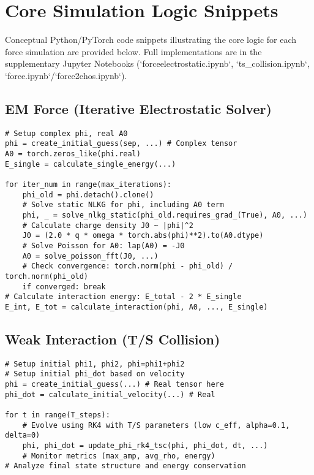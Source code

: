 \documentclass[11pt]{article}
\begin{document}
\appendix
\section{Core Simulation Logic Snippets}
\label{app:code}
Conceptual Python/PyTorch code snippets illustrating the core logic for each force simulation are provided below. Full implementations are in the supplementary Jupyter Notebooks (`forceelectrostatic.ipynb`, `ts_collision.ipynb`, `force.ipynb`/`force2ehos.ipynb`).

\subsection{EM Force (Iterative Electrostatic Solver)}
\begin{lstlisting}[caption=EM Force Logic, label=lst:em_code]
# Setup complex phi, real A0
phi = create_initial_guess(sep, ...) # Complex tensor
A0 = torch.zeros_like(phi.real) 
E_single = calculate_single_energy(...)

for iter_num in range(max_iterations):
    phi_old = phi.detach().clone()
    # Solve static NLKG for phi, including A0 term
    phi, _ = solve_nlkg_static(phi_old.requires_grad_(True), A0, ...) 
    # Calculate charge density J0 ~ |phi|^2
    J0 = (2.0 * q * omega * torch.abs(phi)**2).to(A0.dtype)
    # Solve Poisson for A0: lap(A0) = -J0
    A0 = solve_poisson_fft(J0, ...) 
    # Check convergence: torch.norm(phi - phi_old) / torch.norm(phi_old)
    if converged: break
# Calculate interaction energy: E_total - 2 * E_single
E_int, E_tot = calculate_interaction(phi, A0, ..., E_single) 
\end{lstlisting}

\subsection{Weak Interaction (T/S Collision)}
\begin{lstlisting}[caption=T/S Collision Logic, label=lst:ts_code]
# Setup initial phi1, phi2, phi=phi1+phi2
# Setup initial phi_dot based on velocity
phi = create_initial_guess(...) # Real tensor here
phi_dot = calculate_initial_velocity(...) # Real

for t in range(T_steps):
    # Evolve using RK4 with T/S parameters (low c_eff, alpha=0.1, delta=0)
    phi, phi_dot = update_phi_rk4_tsc(phi, phi_dot, dt, ...) 
    # Monitor metrics (max_amp, avg_rho, energy)
# Analyze final state structure and energy conservation
\end{lstlisting}
\end{document}
